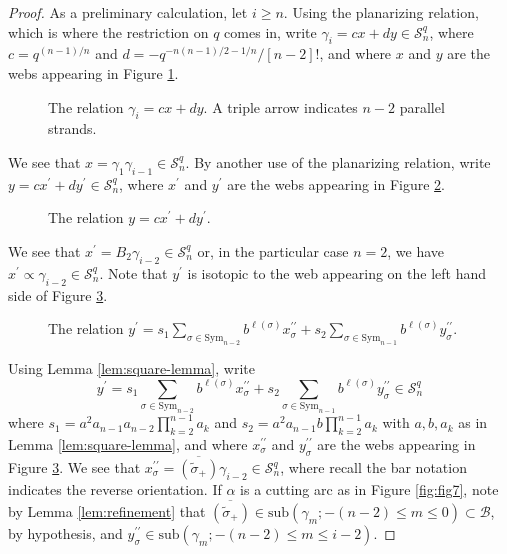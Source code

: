 \documentclass[10pt,a4paper]{amsart}
\renewcommand{\bar}{\overline}
\newcommand{\basgen}{\mcal{B}}
\newcommand{\lift}[1]{\tilde{#1}}
\newcommand{\lp}{\left(}\newcommand{\rp}{\right)}
\newcommand{\mcal}[1]{\mathcal{#1}}
\newcommand{\mrm}[1]{\mathrm{#1}}
\newcommand{\rev}[1]{\bar{#1}}
\newcommand{\sk}{\mcal{S}_n^q}
\newcommand{\sub}[1]{\mrm{sub}\lp#1\rp}
\newcommand{\sym}{\mrm{Sym}}
\renewcommand{\tilde}{\widetilde}
\begin{document}
\begin{proof}
As a preliminary calculation, let $i\geq n$.  Using the planarizing relation, which is where the restriction on $q$ comes in, write $\gamma_i=cx+dy\in\sk$, where $c=q^{(n-1)/n}$ and $d=-q^{-n(n-1)/2-1/n}/[n-2]!$, and where $x$ and $y$ are the webs appearing in Figure \ref{fig:induction-1of3}. 
\begin{figure}[htb!]
\centering

\caption{The relation $\gamma_i=cx+dy$. A triple arrow indicates $n-2$ parallel strands.}
\label{fig:induction-1of3}
\end{figure}

We see that $x=\gamma_1\gamma_{i-1}\in\sk$.  By another use of the planarizing relation, write $y=cx^\prime+dy^\prime\in\sk$, where $x^\prime$ and $y^\prime$ are the webs appearing in Figure \ref{fig:induction-2of3}.  
 
\begin{figure}[htb!]
\centering

\caption{The relation $y=cx^\prime+dy^\prime$.}
\label{fig:induction-2of3}
\end{figure}

We see that $x^\prime=B_2\gamma_{i-2}\in\sk$ or, in the particular case $n=2$, we have $x^\prime\propto\gamma_{i-2}\in\sk$.  Note that $y^\prime$ is isotopic to the web appearing on the left hand side of Figure \ref{fig:induction-3of3}.  
\begin{figure}[htb!]
\centering

\caption{The relation $y^\prime=s_1\sum_{\sigma\in\sym_{n-2}}b^{\ell(\sigma)}x^{\prime\prime}_\sigma+s_2\sum_{\sigma\in\sym_{n-1}}b^{\ell(\sigma)}y^{\prime\prime}_\sigma$.}
\label{fig:induction-3of3}
\end{figure}

Using Lemma \ref{lem:square-lemma}, write 
\begin{equation*}
y^\prime=s_1\sum_{\sigma\in\sym_{n-2}}b^{\ell(\sigma)}x^{\prime\prime}_\sigma+s_2\sum_{\sigma\in\sym_{n-1}}b^{\ell(\sigma)}y^{\prime\prime}_\sigma\in\sk
\end{equation*}
 where $s_1=a^2a_{n-1}a_{n-2}\prod_{k=2}^{n-1}a_k$ and $s_2=a^2a_{n-1}b\prod_{k=2}^{n-1}a_k$ with $a,b,a_k$ as in Lemma \ref{lem:square-lemma}, and where $x^{\prime\prime}_\sigma$ and $y^{\prime\prime}_\sigma$ are the webs appearing in Figure \ref{fig:induction-3of3}.  We see that $x^{\prime\prime}_\sigma=\rev{\lp\lift{\sigma}_+\rp}\gamma_{i-2}\in\sk$,
where recall the bar notation indicates the reverse orientation.  If $\alpha$ is a cutting arc as in Figure \ref{fig:fig7}, note by Lemma \ref{lem:refinement} that $\rev{\lp\lift{\sigma}_+\rp}\in\sub{\gamma_m;-(n-2)\leq m\leq0}\subset\basgen$, by hypothesis, and $y^{\prime\prime}_\sigma\in\sub{\gamma_m;-(n-2)\leq m\leq i-2}$. 


\end{proof}
\end{document}
